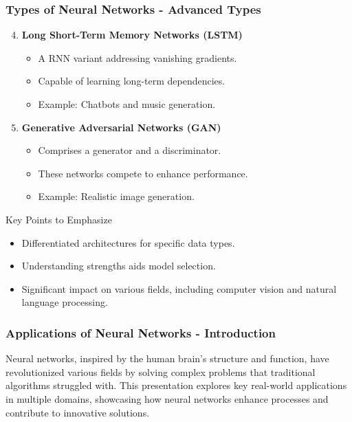 \documentclass[aspectratio=169]{beamer}
\begin{document}
\begin{frame}[fragile]
    \frametitle{Types of Neural Networks - Advanced Types}
    \begin{enumerate}
        \setcounter{enumi}{3}
        \item \textbf{Long Short-Term Memory Networks (LSTM)}
            \begin{itemize}
                \item A RNN variant addressing vanishing gradients.
                \item Capable of learning long-term dependencies.
                \item Example: Chatbots and music generation.
            \end{itemize}

        \item \textbf{Generative Adversarial Networks (GAN)}
            \begin{itemize}
                \item Comprises a generator and a discriminator.
                \item These networks compete to enhance performance.
                \item Example: Realistic image generation.
            \end{itemize}
    \end{enumerate}

    \begin{block}{Key Points to Emphasize}
        \begin{itemize}
            \item Differentiated architectures for specific data types.
            \item Understanding strengths aids model selection.
            \item Significant impact on various fields, including computer vision and natural language processing.
        \end{itemize}
    \end{block}
\end{frame}

\begin{frame}[fragile]
  \frametitle{Applications of Neural Networks - Introduction}
  Neural networks, inspired by the human brain's structure and function, have revolutionized various fields by solving complex problems that traditional algorithms struggled with. 
  This presentation explores key real-world applications in multiple domains, showcasing how neural networks enhance processes and contribute to innovative solutions.
\end{frame}
\end{document}
